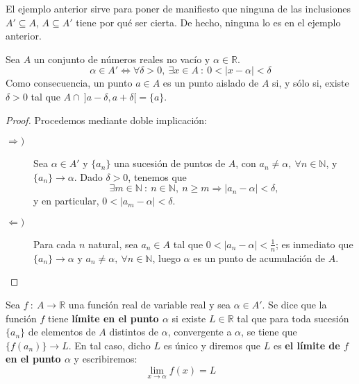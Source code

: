 El ejemplo anterior sirve para poner de manifiesto que ninguna de las inclusiones $A' \subseteq A$, $A \subseteq A'$ tiene por qué ser cierta. De hecho, ninguna lo es en el ejemplo anterior.

\begin{prop}\label{prop:13.1.2}
    Sea $A$ un conjunto de números reales no vacío y $\alpha \in \mathbb{R}$.
    \begin{equation*}
        \alpha \in A' \Longleftrightarrow \forall \delta > 0, ~ \exists x \in A ~:~ 0 < |x-\alpha| < \delta
    \end{equation*}
    Como consecuencia, un punto $a \in A$ es un punto aislado de $A$ si, y sólo si, existe $\delta > 0$ tal que
    $A \cap ~ ]a-\delta,a+\delta[ = \{a\}$.
\end{prop}
\begin{proof} Procedemos mediante doble implicación:
\begin{description}
    \item[$\Longrightarrow)$]
        Sea $\alpha \in A'$ y $\{a_n\}$ una sucesión de puntos de $A$, con $a_n \neq \alpha, ~ \forall n \in \mathbb{N}$, y $\{a_n\} \longrightarrow \alpha$. Dado $\delta > 0$, tenemos que
        \begin{equation*}
            \exists m \in \mathbb{N} ~:~ n \in \mathbb{N}, ~ n \geq m \Longrightarrow |a_n-\alpha| < \delta,
        \end{equation*}
        y en particular, $0 < |a_m - \alpha| < \delta$.
    \item[$\Longleftarrow)$]
        Para cada $n$ natural, sea $a_n \in A$ tal que $0 < |a_n-\alpha| < \frac{1}{n}$; es inmediato que $\{a_n\} \longrightarrow \alpha$ y $a_n \neq \alpha, ~ \forall n \in \mathbb{N}$, luego $\alpha$ es un punto de acumulación de $A$.
\end{description}
\end{proof}

\begin{definicion}
    Sea $f ~:~ A \longrightarrow \mathbb{R}$ una función real de variable real y sea $\alpha \in A'$.
    Se dice que la función $f$ tiene \textbf{límite en el punto $\alpha$} si existe $L \in \mathbb{R}$ tal que para toda sucesión $\{a_n\}$ de elementos de $A$ distintos de $\alpha$, convergente a $\alpha$, se tiene que $\{f(a_n)\} \longrightarrow  L$. En tal caso, dicho $L$ es único y diremos que $L$ es \textbf{el límite de $f$ en el punto $\alpha$} y escribiremos:
    \begin{equation*}
        \lim_{x \to \alpha} f(x) = L
    \end{equation*}
\end{definicion}

